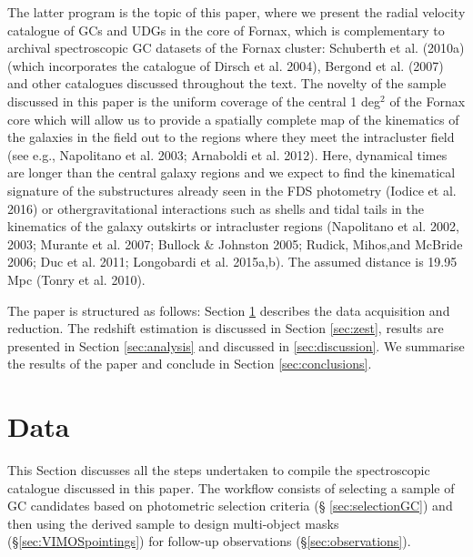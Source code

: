 \documentclass[useAMS,usenatbib]{mn2e}
\begin{document}
The latter program is the topic of this paper, where we present the radial velocity catalogue of GCs and UDGs in the core of Fornax, which is complementary to archival spectroscopic GC datasets of the Fornax cluster: Schuberth et al. (2010a) (which incorporates the catalogue of Dirsch et al. 2004), Bergond et al. (2007) and other catalogues discussed throughout the text. The novelty of the sample discussed in this paper is the uniform coverage of the central 1 deg$^2$ of the Fornax core which will allow us to provide a spatially complete map of the kinematics of the galaxies in the field out to the regions where they meet the intracluster field (see e.g., Napolitano et al. 2003; Arnaboldi et al. 2012). Here, dynamical times are longer than the central galaxy regions and we expect to find the kinematical signature of the substructures already seen in the FDS photometry (Iodice et al. 2016) or othergravitational interactions such as shells and tidal tails in the kinematics of the galaxy outskirts or intracluster regions (Napolitano et al. 2002, 2003; Murante et al. 2007; Bullock & Johnston 2005; Rudick, Mihos,and McBride 2006; Duc et al. 2011; Longobardi et al. 2015a,b). 
The assumed distance is 19.95 Mpc (Tonry et al. 2010).

The paper is structured as follows: Section \ref{sec:data} describes the data acquisition and reduction. The redshift estimation is discussed in Section \ref{sec:zest}, results are presented in Section \ref{sec:analysis} and discussed in \ref{sec:discussion}. We summarise the results of the paper and conclude in Section \ref{sec:conclusions}. 

\section{Data}
\label{sec:data}

This Section discusses all the steps undertaken to compile the spectroscopic catalogue discussed in this paper. The 
workflow consists of selecting a sample of GC candidates based on photometric selection criteria (\S 
\ref{sec:selectionGC}) and then using the derived sample to design multi-object masks (\S \ref{sec:VIMOSpointings}) for follow-up 
observations (\S \ref{sec:observations}).
\end{document}

